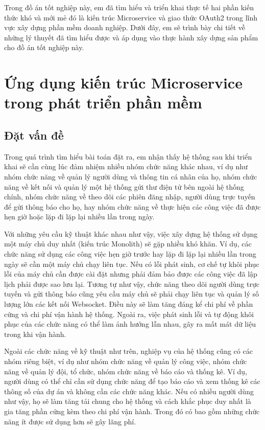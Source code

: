 \documentclass[../DoAn.tex]{subfiles}
\begin{document}
Trong đồ án tốt nghiệp này, em đã tìm hiểu và triển khai thực tế hai phần kiến thức khó và mới mẻ đó là kiến trúc Microservice
và giao thức OAuth2 trong lĩnh vực xây dựng phần mềm doanh nghiệp. Dưới đây, em sẽ trình bày chi tiết về những lý thuyết đã tìm hiểu được
và áp dụng vào thực hành xây dựng sản phẩm cho đồ án tốt nghiệp này.

\section{Ứng dụng kiến trúc Microservice trong phát triển phần mềm}
\label{section:5.1}

\subsection{Đặt vấn đề}
\label{subsection:5.1.1}
Trong quá trình tìm hiểu bài toán đặt ra, em nhận thấy hệ thống sau khi triển khai sẽ cần cùng lúc đảm nhiệm nhiều nhóm chức năng khác nhau,
ví dụ như nhóm chức năng về quản lý người dùng và thông tin cá nhân của họ, nhóm chức năng về kết nối và quản lý một hệ thống gửi thư điện tử bên ngoài
hệ thống chính, nhóm chức năng về theo dõi các phiên đăng nhập, người dùng trực tuyến để gửi thông báo cho họ, hay
nhóm chức năng về thực hiện các công việc đã được hẹn giờ hoặc lặp đi lặp lại nhiều lần trong ngày.

Với những yêu cầu kỹ thuật khác nhau như vậy, việc xây dựng hệ thống sử dụng một máy chủ duy nhất (kiến trúc Monolith) sẽ gặp nhiều khó khăn.
Ví dụ, các chức năng sử dụng các công việc hẹn giờ trước hay lặp đi lặp lại nhiều lần trong ngày sẽ cần một máy chủ chạy liên tục. Nếu có lỗi phát sinh,
cơ chế tự khôi phục lỗi của máy chủ cần được cài đặt nhưng phải đảm bảo được các công việc đã lập lịch phải được sao lưu lại.
Tương tự như vậy, chức năng theo dõi người dùng trực tuyến và gửi thông báo cũng yêu cầu máy chủ sẽ phải chạy liên tục và quản lý số lượng lớn
các kết nối Websocket. Điều này sẽ làm tăng đáng kể chi phí về phần cứng và chi phí vận hành hệ thống. Ngoài ra, việc phát sinh lỗi và tự động khôi phục
của các chức năng có thể làm ảnh hưởng lẫn nhau, gây ra mất mát dữ liệu trong khi vận hành.

Ngoài các chức năng về kỹ thuật như trên, nghiệp vụ của hệ thống cũng có các nhóm riêng biệt, ví dụ như nhóm chức năng về quản lý công việc,
nhóm chức năng về quản lý đội, tổ chức, nhóm chức năng về báo cáo và thống kê. Ví dụ, người dùng có thể chỉ cần sử dụng chức năng để tạo báo cáo
và xem thống kê các thông số của dự án và không cần các chức năng khác. Nếu có nhiều người dùng như vậy, họ sẽ làm tăng tải chung cho hệ thống và
cách khắc phục duy nhất là gia tăng phần cứng kèm theo chi phí vận hành. Trong đó có bao gồm những chức năng ít được sử dụng hơn sẽ gây lãng phí.
\end{document}
